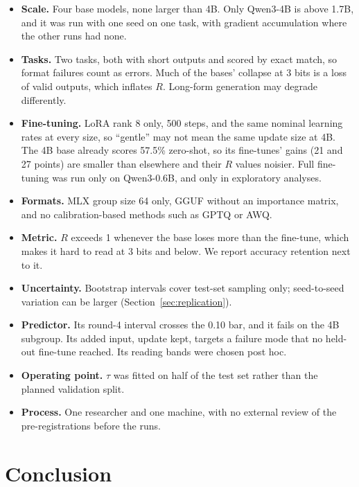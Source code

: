 \documentclass[11pt,letterpaper]{article}
\begin{document}
\begin{itemize}
\item \textbf{Scale.} Four base models, none larger than 4B. Only Qwen3-4B is above 1.7B, and it was run with one seed on one task, with gradient accumulation where the other runs had none.
\item \textbf{Tasks.} Two tasks, both with short outputs and scored by exact match, so format failures count as errors. Much of the bases' collapse at 3 bits is a loss of valid outputs, which inflates $R$. Long-form generation may degrade differently.
\item \textbf{Fine-tuning.} LoRA rank 8 only, 500 steps, and the same nominal learning rates at every size, so ``gentle'' may not mean the same update size at 4B. The 4B base already scores 57.5\% zero-shot, so its fine-tunes' gains (21 and 27 points) are smaller than elsewhere and their $R$ values noisier. Full fine-tuning was run only on Qwen3-0.6B, and only in exploratory analyses.
\item \textbf{Formats.} MLX group size 64 only, GGUF without an importance matrix, and no calibration-based methods such as GPTQ or AWQ.
\item \textbf{Metric.} $R$ exceeds 1 whenever the base loses more than the fine-tune, which makes it hard to read at 3 bits and below. We report accuracy retention next to it.
\item \textbf{Uncertainty.} Bootstrap intervals cover test-set sampling only; seed-to-seed variation can be larger (Section~\ref{sec:replication}).
\item \textbf{Predictor.} Its round-4 interval crosses the 0.10 bar, and it fails on the 4B subgroup. Its added input, update kept, targets a failure mode that no held-out fine-tune reached. Its reading bands were chosen post hoc.
\item \textbf{Operating point.} $\tau$ was fitted on half of the test set rather than the planned validation split.
\item \textbf{Process.} One researcher and one machine, with no external review of the pre-registrations before the runs.
\end{itemize}

\section{Conclusion}
\label{sec:conclusion}
\end{document}
